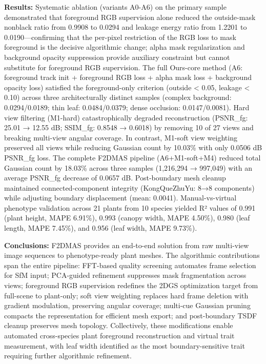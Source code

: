 \documentclass[11pt,a4paper]{article}
\begin{document}
\textbf{Results:} Systematic ablation (variants A0-A6) on the primary
sample demonstrated that foreground RGB supervision alone reduced the
outside-mask nonblack ratio from 0.9908 to 0.0294 and leakage energy
ratio from 1.2201 to 0.0190---confirming that the per-pixel restriction
of the RGB loss to mask foreground is the decisive algorithmic change;
alpha mask regularization and background opacity suppression provide
auxiliary constraint but cannot substitute for foreground RGB
supervision. The full Ours-core method (A6: foreground track init +
foreground RGB loss + alpha mask loss + background opacity loss)
satisfied the foreground-only criterion (outside \textless{} 0.05,
leakage \textless{} 0.10) across three architecturally distinct samples
(complex background: 0.0294/0.0189; thin leaf: 0.0484/0.0379; dense
occlusion: 0.0147/0.0081). Hard view filtering (M1-hard)
catastrophically degraded reconstruction (PSNR\_fg: 25.01 → 12.55 dB;
SSIM\_fg: 0.8548 → 0.6018) by removing 10 of 27 views and breaking
multi-view angular coverage. In contrast, M1-soft view weighting
preserved all views while reducing Gaussian count by 10.03\% with only
0.0506 dB PSNR\_fg loss. The complete F2DMAS pipeline (A6+M1-soft+M4)
reduced total Gaussian count by 18.03\% across three samples (1,216,294
→ 997,049) with an average PSNR\_fg decrease of 0.0657 dB. Post-boundary
mesh cleanup maintained connected-component integrity (KongQueZhuYu: 8→8
components) while adjusting boundary displacement (mean: 0.0041).
Manual-vs-virtual phenotype validation across 21 plants from 10 species
yielded R² values of 0.991 (plant height, MAPE 6.91\%), 0.993 (canopy
width, MAPE 4.50\%), 0.980 (leaf length, MAPE 7.45\%), and 0.956 (leaf
width, MAPE 9.73\%).

\textbf{Conclusions:} F2DMAS provides an end-to-end solution from raw
multi-view image sequences to phenotype-ready plant meshes. The
algorithmic contributions span the entire pipeline: FFT-based quality
screening automates frame selection for SfM input; PCA-guided refinement
suppresses mask fragmentation across views; foreground RGB supervision
redefines the 2DGS optimization target from full-scene to plant-only;
soft view weighting replaces hard frame deletion with gradient
modulation, preserving angular coverage; multi-cue Gaussian pruning
compacts the representation for efficient mesh export; and post-boundary
TSDF cleanup preserves mesh topology. Collectively, these modifications
enable automated cross-species plant foreground reconstruction and
virtual trait measurement, with leaf width identified as the most
boundary-sensitive trait requiring further algorithmic refinement.
\end{document}
